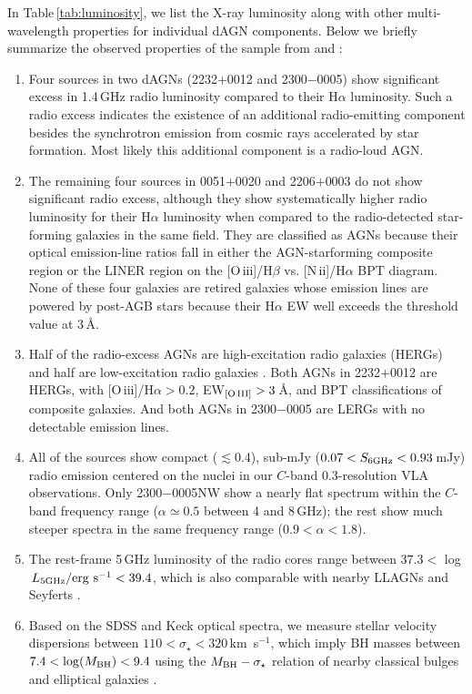 \documentclass[iop,revtex4,twocolumn,apj,numberedappendix,appendixfloats]{emulateapj}
\newcommand{\kms}{km~s$^{-1}$}
\begin{document}
In Table\,\ref{tab:luminosity}, we list the X-ray luminosity along with other multi-wavelength properties for individual dAGN components. Below we briefly summarize the observed properties of the sample from  and : 

\begin{enumerate}

\item Four sources in two dAGNs (2232$+$0012 and 2300$-$0005) show significant excess in 1.4\,GHz radio luminosity compared to their H$\alpha$ luminosity. Such a radio excess indicates the existence of an additional radio-emitting component besides the synchrotron emission from cosmic rays accelerated by star formation. Most likely this additional component is a radio-loud AGN. 

\item The remaining four sources in 0051$+$0020 and 2206$+$0003 do not show significant radio excess, although they show systematically higher radio luminosity for their H$\alpha$ luminosity when compared to the radio-detected star-forming galaxies in the same field. They are classified as AGNs because their optical emission-line ratios fall in either the AGN-starforming composite region or the LINER region on the [O\,{\sc iii}]/H$\beta$ vs. [N\,{\sc ii}]/H$\alpha$ BPT diagram. None of these four galaxies are retired galaxies whose emission lines are powered by post-AGB stars because their H$\alpha$ EW well exceeds the threshold value at 3\,\AA. 

\item Half of the radio-excess AGNs are high-excitation radio galaxies (HERGs) and half are low-excitation radio galaxies \citep[LERGs;][]{Laing94}. Both AGNs in 2232$+$0012 are HERGs, with [O\,{\sc iii}]/H$\alpha > 0.2$, EW$_{\rm [O\,III]} > 3$\,\AA, and BPT classifications of composite galaxies. And both AGNs in 2300$-$0005 are LERGs with no detectable emission lines. 

\item All of the sources show compact ($\lesssim$0.4\arcsec), sub-mJy ($0.07 < S_{\rm 6GHz} < 0.93$\,mJy) radio emission centered on the nuclei in our $C$-band 0.3\arcsec-resolution VLA observations. Only 2300$-$0005NW show a nearly flat spectrum within the $C$-band frequency range ($\alpha \simeq 0.5$ between 4 and 8\,GHz); the rest show much steeper spectra in the same frequency range ($0.9 < \alpha < 1.8$).

\item The rest-frame 5\,GHz luminosity of the radio cores range between $37.3 < $ log$\,L_{\rm 5GHz}/{\rm erg~s}^{-1} < 39.4$, which is also comparable with nearby LLAGNs and Seyferts \citep{Ho08,She17}.

\item Based on the SDSS and Keck optical spectra, we measure stellar velocity dispersions between $110 < \sigma_\star < 320$\,\kms, which imply BH masses between $7.4 < \log(M_{\rm BH}) < 9.4$ using the $M_{\rm BH}-\sigma_\star$ relation of nearby classical bulges and elliptical galaxies \citep{Kormendy13}. 

\end{enumerate}
\end{document}
